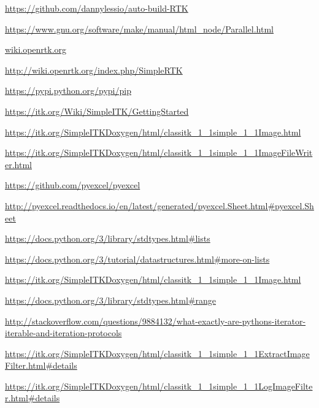 \documentclass[a4paper,12pt, doubleside]{report}
\begin{document}
\begin{thebibliography}{1}
        
        \url{https://github.com/dannylessio/auto-build-RTK}
    
        \url{https://www.gnu.org/software/make/manual/html_node/Parallel.html}    
    
        \url{wiki.openrtk.org}    
        
        \url{http://wiki.openrtk.org/index.php/SimpleRTK}    
        
        \url{https://pypi.python.org/pypi/pip}    
        
        \url{https://itk.org/Wiki/SimpleITK/GettingStarted}
        
        \url{https://itk.org/SimpleITKDoxygen/html/classitk_1_1simple_1_1Image.html}
        
        \url{https://itk.org/SimpleITKDoxygen/html/classitk_1_1simple_1_1ImageFileWriter.html}
        
        \url{https://github.com/pyexcel/pyexcel}
        
        \url{http://pyexcel.readthedocs.io/en/latest/generated/pyexcel.Sheet.html#pyexcel.Sheet}
        
        \url{https://docs.python.org/3/library/stdtypes.html#lists} 
       
        \url{https://docs.python.org/3/tutorial/datastructures.html#more-on-lists}
        
        \url{https://itk.org/SimpleITKDoxygen/html/classitk_1_1simple_1_1Image.html}
    
        \url{https://docs.python.org/3/library/stdtypes.html#range}
        
        \url{http://stackoverflow.com/questions/9884132/what-exactly-are-pythons-iterator-iterable-and-iteration-protocols} 
        
        \url{https://itk.org/SimpleITKDoxygen/html/classitk_1_1simple_1_1ExtractImageFilter.html#details}
        
        \url{https://itk.org/SimpleITKDoxygen/html/classitk_1_1simple_1_1LogImageFilter.html#details}
        

\end{thebibliography}
\end{document}
